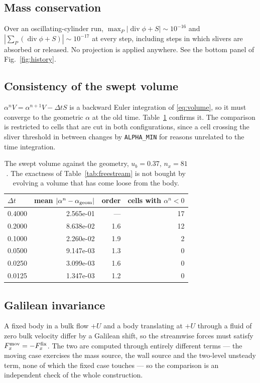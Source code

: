 \documentclass[11pt,a4paper]{article}
\theoremstyle{remark}
\newcommand{\dt}{\Delta t}
\begin{document}
\subsection{Mass conservation}

Over an oscillating-cylinder run, $\max_P|\operatorname{div}\phi+S|\sim10^{-16}$ and
$|\sum_P(\operatorname{div}\phi+S)|\sim10^{-17}$ at every step, including steps in which slivers
are absorbed or released. No projection is applied anywhere. See the bottom panel of
Fig.~\ref{fig:history}.

\subsection{Consistency of the swept volume}

$\alpha^{n}V=\alpha^{n+1}V-\dt S$ is a backward Euler integration of \eqref{eq:volume}, so it
must converge to the geometric $\alpha$ at the old time. Table~\ref{tab:swept} confirms it. The
comparison is restricted to cells that are cut in both configurations, since a cell crossing the
sliver threshold in between changes by \texttt{ALPHA\_MIN} for reasons unrelated to the time
integration.

\begin{table}[h]
\centering\small
\begin{tabular}{@{}lrrr@{}}
\toprule
$\dt$ & mean $|\alpha^{n}-\alpha_{\rm geom}|$ & order & cells with $\alpha^{n}<0$\\
\midrule
0.4000 & 2.565e-01 & --- & 17\\
0.2000 & 8.638e-02 & 1.6 & 12\\
0.1000 & 2.260e-02 & 1.9 & 2\\
0.0500 & 9.147e-03 & 1.3 & 0\\
0.0250 & 3.099e-03 & 1.6 & 0\\
0.0125 & 1.347e-03 & 1.2 & 0\\
\bottomrule
\end{tabular}
\caption{The swept volume against the geometry, $u_b=0.37$, $n_x=81$. The exactness of
Table~\ref{tab:freestream} is not bought by evolving a volume that has come loose from the body.}
\label{tab:swept}
\end{table}

\subsection{Galilean invariance}

A fixed body in a bulk flow $+U$ and a body translating at $+U$ through a fluid of zero bulk
velocity differ by a Galilean shift, so the streamwise forces must satisfy $F^{\rm mov}_x=
-F^{\rm fix}_x$. The two are computed through entirely different terms --- the moving case
exercises the mass source, the wall source and the two-level unsteady term, none of which the
fixed case touches --- so the comparison is an independent check of the whole construction.

\end{document}
